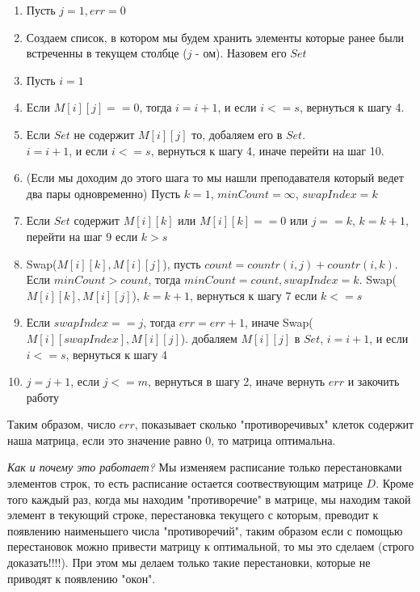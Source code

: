 \documentclass{article}
\begin{document}
\begin{enumerate}
    \item Пусть \(j = 1, err = 0\)
    \item Создаем список, в котором мы будем хранить элементы которые ранее были встреченны в текущем столбце (\(j\) - ом). Назовем его \(Set\)
    \item Пусть \(i = 1\)
    \item Если \(M[i][j] == 0\), тогда  \(i = i + 1\), и если \(i <= s\), вернуться к шагу 4.
    \item Если \(Set\) не содержит \(M[i][j]\) то, добаляем его в \(Set\). \\ \(i = i + 1\), и если \(i <= s\),
    вернуться к шагу 4, иначе перейти на шаг 10.
    \item (Если мы доходим до этого шага то мы нашли преподавателя который ведет два пары одновременно) 
    Пусть \(k = 1\), \(minCount = \infty\),  \( swapIndex = k \)
    \item Если \(Set\) содержит \(M[i][k]\) или \(M[i][k] == 0\) или \(j == k\), \(k = k + 1\), перейти на шаг 9  если \(k > s\)
    \item Swap(\(M[i][k], M[i][j]\)), пусть \(count = countr(i, j) + countr(i ,k)\). \\Если \(minCount > count\), тогда \(minCount = count, swapIndex = k \). Swap(\(M[i][k], M[i][j]\)), \(k = k + 1\), вернуться к шагу 7 если \(k <= s\)
    \item Если \(swapIndex == j \), тогда \(err = err + 1\), иначе Swap(\(M[i][swapIndex], M[i][j]\)). добаляем \(M[i][j]\) в \(Set\), \(i = i + 1\), и если \(i <= s\),
    вернуться к шагу 4
    \item \(j = j + 1\), если \(j <= m\), вернуться в шагу 2, иначе вернуть \(err\) и закочить работу
\end{enumerate}
Таким образом, число \(err\), показывает сколько "противоречивых" клеток содержит наша матрица, если это значение равно 0, то матрица оптимальна.
\par
\textit{Как и почему это работает?} Мы изменяем расписание только перестановками элементов строк, то есть расписание остается соотвествующим матрице \(D\). Кроме того каждый раз, когда мы находим "противоречие" в матрице, мы находим такой элемент в текующий строке, перестановка текущего с которым, преводит к появлению наименьшего числа "противоречий", таким образом если с помощью перестановок можно привести матрицу к оптимальной, то мы это сделаем (строго доказать!!!!). При этом мы делаем только такие перестановки, которые не приводят к появлению "окон".
\end{document}
